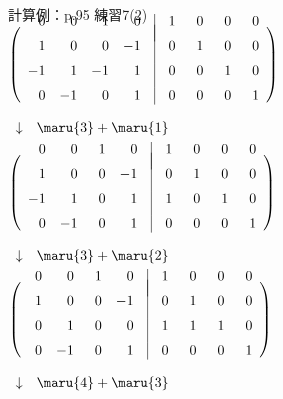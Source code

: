 \documentclass[a4paper,10pt,onecolumn,oneside,notitlepage,final]{jsarticle} %
\begin{document}
\begin{multicols}{2}
\newpage

計算例：p.95 練習7(2)\\%

$\left(\begin{array}{rrrr@{\quad}|rrrr}
\quad&\quad&\quad&\quad&\quad&\quad&\quad&\quad\\[-7mm]
   0&   0&   1&   0&   1&   0&   0&   0\\[2mm]
   1&   0&   0&  -1&   0&   1&   0&   0\\[2mm]
  -1&   1&  -1&   1&   0&   0&   1&   0\\[2mm]
   0&  -1&   0&   1&   0&   0&   0&   1
\end{array}\right)$\par
$\begin{array}{ll}\downarrow
&\maru{3}+\maru{1}\\
\end{array}$\par
$\left(\begin{array}{rrrr@{\quad}|rrrr}
\quad&\quad&\quad&\quad&\quad&\quad&\quad&\quad\\[-7mm]
   0&   0&   1&   0&   1&   0&   0&   0\\[2mm]
   1&   0&   0&  -1&   0&   1&   0&   0\\[2mm]
  -1&   1&   0&   1&   1&   0&   1&   0\\[2mm]
   0&  -1&   0&   1&   0&   0&   0&   1
\end{array}\right)$\par
$\begin{array}{ll}\downarrow
&\maru{3}+\maru{2}\\
\end{array}$\par
$\left(\begin{array}{rrrr@{\quad}|rrrr}
\quad&\quad&\quad&\quad&\quad&\quad&\quad&\quad\\[-7mm]
   0&   0&   1&   0&   1&   0&   0&   0\\[2mm]
   1&   0&   0&  -1&   0&   1&   0&   0\\[2mm]
   0&   1&   0&   0&   1&   1&   1&   0\\[2mm]
   0&  -1&   0&   1&   0&   0&   0&   1
\end{array}\right)$\par
$\begin{array}{ll}\downarrow
&\maru{4}+\maru{3}\\
\end{array}$\par

\end{multicols}
\end{document}
